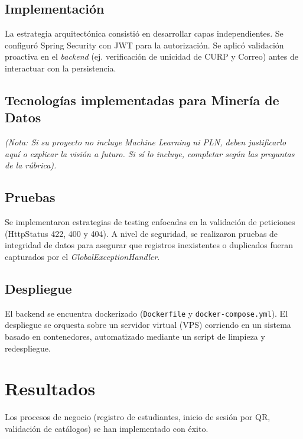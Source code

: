 \documentclass[12pt, a4paper]{article}
\begin{document}
\subsection{Implementación}
La estrategia arquitectónica consistió en desarrollar capas independientes. Se configuró Spring Security con JWT para la autorización. Se aplicó validación proactiva en el \textit{backend} (ej. verificación de unicidad de CURP y Correo) antes de interactuar con la persistencia.

\subsection{Tecnologías implementadas para Minería de Datos}
\textit{(Nota: Si su proyecto no incluye Machine Learning ni PLN, deben justificarlo aquí o explicar la visión a futuro. Si sí lo incluye, completar según las preguntas de la rúbrica).}

\subsection{Pruebas}
Se implementaron estrategias de testing enfocadas en la validación de peticiones (HttpStatus 422, 400 y 404). A nivel de seguridad, se realizaron pruebas de integridad de datos para asegurar que registros inexistentes o duplicados fueran capturados por el \textit{GlobalExceptionHandler}.

\subsection{Despliegue}
El backend se encuentra dockerizado (\texttt{Dockerfile} y \texttt{docker-compose.yml}). El despliegue se orquesta sobre un servidor virtual (VPS) corriendo en un sistema basado en contenedores, automatizado mediante un script de limpieza y redespliegue.

\section{Resultados}

Los procesos de negocio (registro de estudiantes, inicio de sesión por QR, validación de catálogos) se han implementado con éxito.
\end{document}

